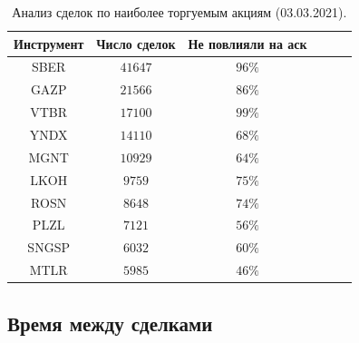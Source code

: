 \begin{table}[h!]
    \begin{center}
        \begin{tabular}{|c|c|c|c|c|c|}
            \hline
        Инструмент   & Число сделок & Не повлияли на аск %
        \\ \hline
        SBER &  $41647$  & $ 96\% $ %
        \\ \hline
        GAZP &  $21566$  & $ 86\% $ %
        \\ \hline
        VTBR &  $17100$  & $ 99\% $ %
         \\ \hline
        YNDX &  $14110$  & $ 68\% $ %
        \\ \hline
        MGNT &  $10929$  & $ 64\% $ %
        \\ \hline
        LKOH &  $9759 $ &  $ 75\% $ %
        \\ \hline
        ROSN &  $8648 $ &  $ 74\% $ %
         \\ \hline
        PLZL &  $7121 $ &  $ 56\% $ %
        \\ \hline
        SNGSP & $ 6032$  & $ 60\% $ %
        \\ \hline
        MTLR &  $5985 $ &  $ 46\% $ %
        \\ \hline
        \end{tabular}
    \end{center}
    \label{tableanalSE}
    \caption{Анализ сделок по наиболее торгуемым акциям (03.03.2021).}
\end{table} 


\subsection{Время между сделками}

